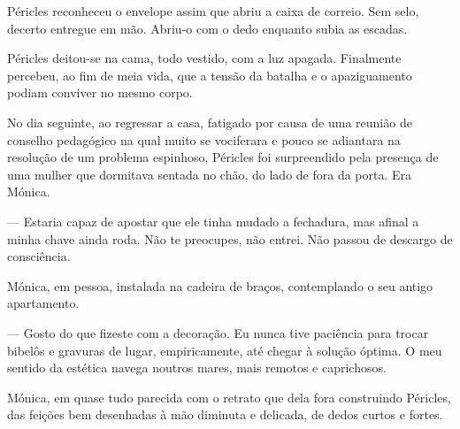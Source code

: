 Péricles reconheceu o envelope assim que abriu a caixa de correio. Sem
selo, decerto entregue em mão. Abriu-o com o dedo enquanto subia as
escadas.

\begin{quotation}
\end{quotation}

Péricles deitou-se na cama, todo vestido, com a luz apagada.
Finalmente percebeu, ao fim de meia vida, que a tensão da batalha e o
apaziguamento podiam conviver no mesmo corpo.

No dia seguinte, ao
regressar a casa, fatigado por causa de uma reunião de conselho
pedagógico na qual muito se vociferara e pouco se adiantara na
resolução de um problema espinhoso, Péricles foi surpreendido pela
presença de uma mulher que dormitava sentada no chão, do lado de fora da
porta. Era Mónica.

--- Estaria capaz de apostar que ele tinha mudado a fechadura, mas
  afinal a minha chave ainda roda. Não te preocupes, não entrei. Não
  passou de descargo de consciência.


Mónica, em pessoa, instalada na cadeira de braços, contemplando o seu
antigo apartamento.

--- Gosto do que fizeste com a decoração. Eu nunca tive paciência para
  trocar bibelôs e gravuras de lugar, empiricamente, até chegar à
  solução óptima. O meu sentido da estética navega noutros mares, mais
  remotos e caprichosos.


Mónica, em quase tudo parecida com o retrato que dela fora construindo
Péricles, das feições bem desenhadas à mão diminuta e delicada, de dedos
curtos e fortes.

